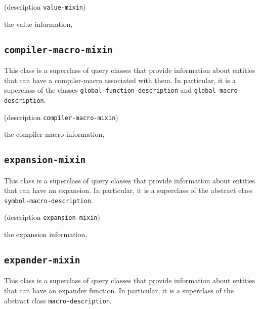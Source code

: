 {\footnotesize
{}
}

{\footnotesize
{} {(description {\tt value-mixin})}
}

 the value information, 

\subsection{\texttt{compiler-macro-mixin}}
\label{sec-compiler-macro-mixin}

{\footnotesize
{}
}

This class is a superclass of query classes that provide information
about entities that can have a compiler-macro associated with them.
In particular, it is a superclass of the classes
\texttt{global-function-description} and
\texttt{global-macro-description}.

{\footnotesize
{}
}

{\footnotesize
{} {(description {\tt compiler-macro-mixin})}
}

 the compiler-macro information, 

\subsection{\texttt{expansion-mixin}}
\label{sec-expansion-mixin}

{\footnotesize
{}
}

This class is a superclass of query classes that provide information
about entities that can have an expansion.  In particular, it is a
superclass of the abstract class \texttt{symbol-macro-description}.

{\footnotesize
{}
}

{\footnotesize
{} {(description {\tt expansion-mixin})}
}

 the expansion information, 

\subsection{\texttt{expander-mixin}}
\label{sec-expander-mixin}

{\footnotesize
{}
}

This class is a superclass of query classes that provide information
about entities that can have an expander function.  In particular, it is
a superclass of the abstract class \texttt{macro-description}.

